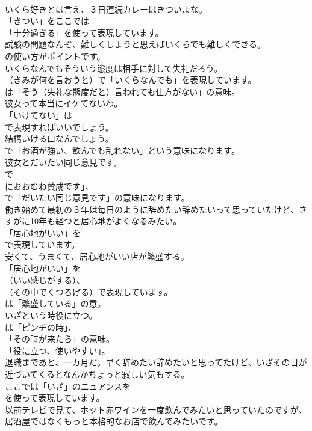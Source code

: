 \documentclass[8pt]{extreport}
\begin{document}
\begin{CJK}{UTF8}{min}
\\	いくら好きとは言え、３日連続カレーはきついよな。 
\\	「きつい」をここでは
\\	「十分過ぎる」を使って表現しています。	
\\	試験の問題なんぞ、難しくしようと思えばいくらでも難しくできる。 
\\	の使い方がポイントです。	
\\	いくらなんでもそういう態度は相手に対して失礼だろう。 
\\	（きみが何を言おうと）で「いくらなんでも」を表現しています。
\\	は「そう（失礼な態度だと）言われても仕方がない」の意味。	
\\	彼女って本当にイケてないわ。 
\\	「いけてない」は 
\\	で表現すればいいでしょう。	
\\	結構いける口なんでしょう。 
\\	で「お酒が強い、飲んでも乱れない」という意味になります。	
\\	彼女とだいたい同じ意見です。 
\\	で
\\	におおむね賛成です」、
\\	で「だいたい同じ意見です」の意味になります。	
\\	働き始めて最初の３年は毎日のように辞めたい辞めたいって思っていたけど、さすがに10年も経つと居心地がよくなるみたい。 
\\	「居心地がいい」を 
\\	で表現しています。	
\\	安くて、うまくて、居心地がいい店が繁盛する。 
\\	「居心地がいい」を 
\\	（いい感じがする）、
\\	（その中でくつろげる）で表現しています。
\\	は「繁盛している」の意。	
\\	いざという時役に立つ。 
\\	は「ピンチの時」、
\\	「その時が来たら」の意味。
\\	「役に立つ、使いやすい」。	
\\	退職まであと、一カ月だ。早く辞めたい辞めたいと思ってたけど、いざその日が近づいてくるとなんかちょっと寂しい気もする。 
\\	ここでは「いざ」のニュアンスを 
\\	を使って表現しています。	
\\	以前テレビで見て、ホット赤ワインを一度飲んでみたいと思っていたのですが、居酒屋ではなくもっと本格的なお店で飲んでみたいです。 

\end{CJK}
\end{document}
